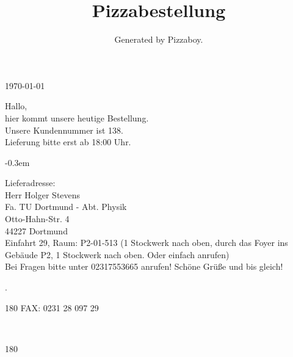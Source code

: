 \documentclass{scrartcl}
\title{Pizzabestellung}
\author{Generated by Pizzaboy.}
\begin{document}
\begin{flushright}
\today{} \thistime
\end{flushright}

Hallo, \\

hier kommt unsere heutige Bestellung. \\
Unsere Kundennummer ist 138. \\
Lieferung bitte erst ab 18:00 Uhr.\\

\begin{itemize}
\itemsep-0.3em

\end{itemize}

Lieferadresse: \\

Herr Holger Stevens \\
Fa. TU Dortmund - Abt. Physik \\
Otto-Hahn-Str. 4 \\
44227 Dortmund \\

Einfahrt 29, Raum: P2-01-513 (1 Stockwerk nach oben, durch das Foyer ins Gebäude P2, 1 Stockwerk nach oben. Oder einfach anrufen) \\
Bei Fragen bitte unter 02317553665 anrufen! Schöne Grüße und bis gleich!


\newpage

.\\[40em]
\begin{turn}{180}
    \Huge FAX: 0231 28 097 29
\end{turn} \\ [2cm]
\begin{turn}{180}
    \normalsize %
\end{turn}
\end{document}
